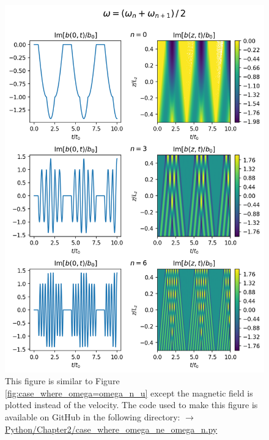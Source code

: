 \begin{figure}
    \centering
    \vspace{-30pt}
    \includegraphics[width=\textwidth,height=0.95\textheight,keepaspectratio]{figures/chapter02/case_where_omega_ne_omega_n_b.png}
    \vspace{-10pt}
    \caption{This figure is similar to Figure \ref{fig:case_where_omega=omega_n_u} except the magnetic field is plotted instead of the velocity. The code used to make this figure is available on GitHub in the following directory:\newline
    \href{https://github.com/aleksyprok/apkp_thesis/blob/main/Python/Chapter2/case_where_omega_ne_omega_n.py}{$\rightarrow$ Python/Chapter2/case\_where\_omega\_ne\_omega\_n.py}}
    \vspace{-30pt}
    \label{fig:case_where_omega_ne_omega_n_b}
\end{figure}

